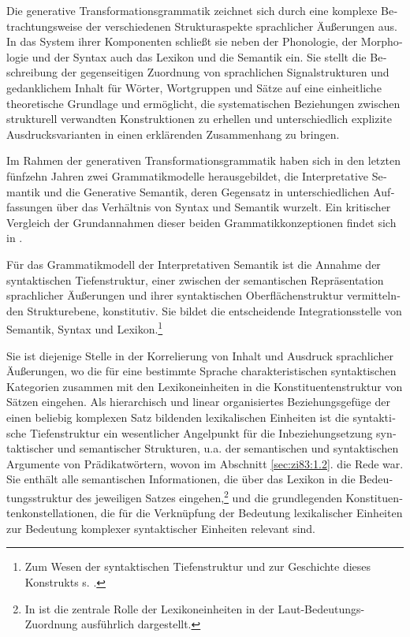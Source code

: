 \documentclass[output=paper]{langscibook}
\begin{document}
\begin{otherlanguage}{german}
Die generative Transformationsgrammatik zeichnet sich durch eine komplexe Betrachtungsweise der verschiedenen Strukturaspekte sprachlicher Äußerungen aus. In das System ihrer Komponenten schließt sie neben der Phonologie, der Morphologie und der Syntax auch das Lexikon und die Semantik ein. Sie stellt die Beschreibung der gegenseitigen Zuordnung von sprachlichen Signalstrukturen und gedanklichem Inhalt für Wörter, Wortgruppen und Sätze auf eine einheitliche theoretische Grundlage und ermöglicht, die systematischen Bezie\-hungen zwischen strukturell verwandten Konstruktionen zu erhellen und unterschiedlich explizite Ausdrucksvarianten in einen erklärenden Zusammenhang zu bringen.

Im Rahmen der generativen Transformationsgrammatik haben sich in den letz\-ten fünfzehn Jahren zwei Grammatikmodelle herausgebildet, die Interpretative Semantik und die Generative Semantik, deren Gegensatz in unterschiedlichen Auffassungen über das Verhältnis von Syntax und Semantik wurzelt. Ein kritischer Vergleich der Grundannahmen dieser beiden Grammatikkonzeptionen findet sich in \citet{pasch1983die-rolle-der-semantik-in-der-generativen-grammatik}.

Für das Grammatikmodell der Interpretativen Semantik ist die Annahme der syntaktischen Tiefenstruktur, einer zwischen der semantischen Repräsentation sprachlicher Äußerungen und ihrer syntaktischen Oberflächenstruktur vermittelnden Strukturebene, konstitutiv. Sie bildet die entscheidende Integrationsstelle von Semantik, Syntax und Lexikon.\footnote{Zum Wesen der syntaktischen Tiefenstruktur und zur Geschichte dieses Konstrukts s. \citet[Kap. 1]{ruzicka1980studien-zum-verhaltnis-von-syntax-und-semantik-im-modernen-russischen}.}

Sie ist diejenige Stelle in der Korrelierung von Inhalt und Ausdruck sprachlicher Äußerungen, wo die für eine bestimmte Sprache charakteristischen syntaktischen Kategorien zusammen mit den Lexikoneinheiten in die Konstituentenstruktur von Sätzen eingehen. Als hierarchisch und linear organisiertes Bezie\-hungs\-gefüge der einen beliebig komplexen Satz bildenden lexikalischen Einheiten ist die syntaktische Tiefenstruktur ein wesentlicher Angelpunkt für die In\-be\-zie\-hung\-setzung syntaktischer und semantischer Strukturen, u.a. der semantischen und syntaktischen Argumente von Prädikatwörtern, wovon im Abschnitt \ref{sec:zi83:1.2}. die Rede war. Sie enthält alle semantischen Informationen, die über das Lexikon in die Bedeutungsstruktur des jeweiligen Satzes eingehen,\footnote{In \citet[Abschnitt 3.]{pasch1983die-rolle-der-semantik-in-der-generativen-grammatik} ist die zentrale Rolle der Lexikoneinheiten in der Laut-Bedeutungs-Zuordnung ausführlich dargestellt.} und die grundlegenden Konstituentenkonstellationen, die für die Verknüpfung der Bedeutung le\-xi\-ka\-li\-scher Einheiten zur Bedeutung komplexer syn\-tak\-ti\-scher Einheiten relevant sind.


\end{otherlanguage}
\end{document}
